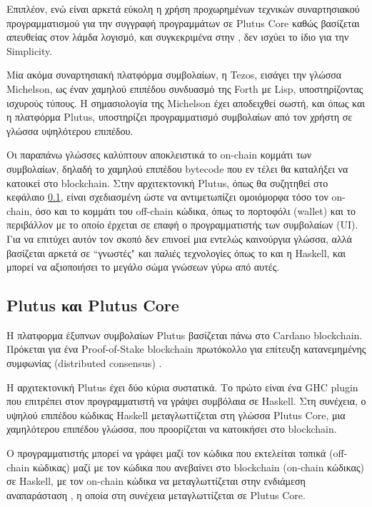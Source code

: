 Επιπλέον, ενώ είναι αρκετά εύκολη η χρήση προχωρημένων τεχνικών συναρτησιακού
προγραμματισμού για την συγγραφή προγραμμάτων σε Plutus Core καθώς βασίζεται
απευθείας στον λάμδα λογισμό, και συγκεκριμένα στην \FOM{}, δεν ισχύει το ίδιο
για την Simplicity.

Μία ακόμα συναρτησιακή πλατφόρμα συμβολαίων, η Tezos, εισάγει την γλώσσα
Michelson, ως έναν χαμηλού επιπέδου συνδυασμό της Forth με Lisp, υποστηρίζοντας
ισχυρούς τύπους.  Η σημασιολογία της Michelson έχει αποδειχθεί σωστή, και όπως
και η πλατφόρμα Plutus, υποστηρίζει προγραμματισμό συμβολαίων από τον χρήστη σε
γλώσσα υψηλότερου επιπέδου.

Οι παραπάνω γλώσσες καλύπτουν αποκλειστικά το on-chain κομμάτι των συμβολαίων,
δηλαδή το χαμηλού επιπέδου bytecode που εν τέλει θα καταλήξει να κατοικεί στο
blockchain. Στην αρχιτεκτονική Plutus, όπως θα συζητηθεί στο κεφάλαιο
\ref{subsec:plutus}, είναι σχεδιασμένη ώστε να αντιμετωπίζει ομοιόμορφα τόσο
τον on-chain, όσο και το κομμάτι του off-chain κώδικα, όπως το πορτοφόλι
(wallet) και το περιβάλλον με το οποίο έρχεται σε επαφή ο προγραμματιστής των
συμβολαίων (UI). Για να επιτύχει αυτόν τον σκοπό δεν επινοεί μια εντελώς
καινούργια γλώσσα, αλλά βασίζεται αρκετά σε ``γνωστές" και παλιές τεχνολογίες
όπως το \FOM και η Haskell, και μπορεί να αξιοποιήσει το μεγάλο σώμα γνώσεων
γύρω από αυτές.

\subsection{Plutus και Plutus Core} \label{subsec:plutus}

Η πλατφορμα έξυπνων συμβολαίων Plutus βασίζεται πάνω στο Cardano blockchain.
Πρόκεται για ένα Proof-of-Stake blockchain πρωτόκολλο για επίτευξη
κατανεμημένης συμφωνίας (distributed consensus) \cite{ouroboros}.

Η αρχιτεκτονική Plutus έχει δύο κύρια συστατικά. Το πρώτο είναι ένα GHC plugin
που επιτρέπει στον προγραμματιστή να γράψει συμβόλαια σε Haskell.  Στη
συνέχεια, ο υψηλού επιπέδου κώδικας Haskell μεταγλωττίζεται στη γλώσσα Plutus
Core, μια χαμηλότερου επιπέδου γλώσσα, που προορίζεται να κατοικήσει στο
blockchain.

Ο προγραμματιστής μπορεί να γράφει μαζί τον κώδικα που εκτελείται τοπικά
(off-chain κώδικας) μαζί με τον κώδικα που ανεβαίνει στο blockchain (on-chain
κώδικας) σε Haskell, με τον on-chain κώδικα να μεταγλωττίζεται στην ενδιάμεση
αναπαράσταση \FIR{},  η οποία στη συνέχεια μεταγλωττίζεται σε Plutus Core.

